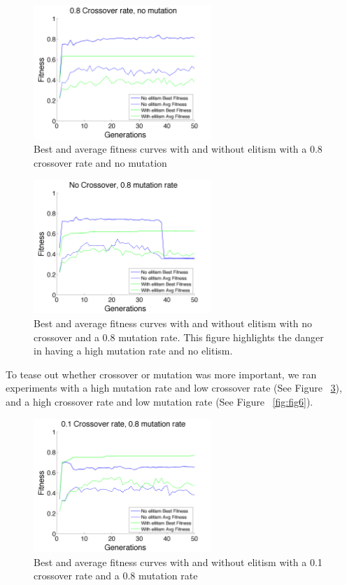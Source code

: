 \documentclass[11pt]{article}
\begin{document}
\begin{figure}[H]
 \centering
  \includegraphics[width=0.6\textwidth,height=0.2\textheight]{figures/fitness0mut08cross.png}
  \caption{Best and average fitness curves with and without elitism with a 0.8 crossover rate and no mutation}
  \label{fig:fig3}  
\end{figure}

\begin{figure}[H]
 \centering
  \includegraphics[width=0.6\textwidth,height=0.2\textheight]{figures/fitness08mut0crossDrop.png}
  \caption{Best and average fitness curves with and without elitism with no crossover and a 0.8 mutation rate. This figure highlights the danger in having a high mutation rate and no elitism.}
  \label{fig:fig4}  
\end{figure}

To tease out whether crossover or mutation was more important, we ran experiments with a high mutation rate and low crossover rate (See Figure ~\ref{fig:fig5}), and a high crossover rate and low mutation rate (See Figure ~\ref{fig:fig6}). 

\begin{figure}[H]
 \centering
  \includegraphics[width=0.6\textwidth,height=0.2\textheight]{figures/fitness08mut01cross.png}
  \caption{Best and average fitness curves with and without elitism with a 0.1 crossover rate and a 0.8 mutation rate}
  \label{fig:fig5}  
\end{figure}
\end{document}
